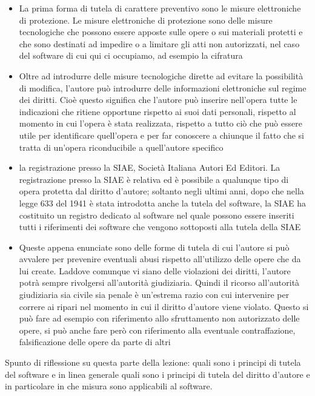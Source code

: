 \begin{itemize}
    \item La prima forma di tutela di carattere preventivo sono le misure elettroniche di protezione. Le misure elettroniche di protezione sono delle misure tecnologiche che possono essere apposte sulle opere o sui materiali protetti e che sono destinati ad impedire o a limitare gli atti non autorizzati, nel caso del software di cui qui ci occupiamo, ad esempio la cifratura
    \item Oltre ad introdurre delle misure tecnologiche dirette ad evitare la possibilità di modifica, l'autore può introdurre delle informazioni elettroniche sul regime dei diritti. Cioè questo significa che l'autore può inserire nell'opera tutte le indicazioni che ritiene opportune rispetto ai suoi dati personali, rispetto al momento in cui l'opera è stata realizzata, rispetto a tutto ciò che può essere utile per identificare quell'opera e per far conoscere a chiunque il fatto che si tratta di un'opera riconducibile a quell'autore specifico
    \item la registrazione presso la SIAE, Società Italiana Autori Ed Editori. La registrazione presso la SIAE è relativa ed è possibile a qualunque tipo di opera protetta dal diritto d'autore; soltanto negli ultimi anni, dopo che nella legge 633 del 1941 è stata introdotta anche la tutela del software, la SIAE ha costituito un registro dedicato al software nel quale possono essere inseriti tutti i riferimenti dei software che vengono sottoposti alla tutela della SIAE
    \item Queste appena enunciate sono delle forme di tutela di cui l'autore si può avvalere per prevenire eventuali abusi rispetto all'utilizzo delle opere che da lui create. Laddove comunque vi siano delle violazioni dei diritti, l'autore potrà sempre rivolgersi all'autorità giudiziaria. Quindi il ricorso all'autorità giudiziaria sia civile sia penale è un'estrema razio con cui intervenire per correre ai ripari nel momento in cui il diritto d'autore viene violato. Questo si può fare ad esempio con riferimento allo sfruttamento non autorizzato delle opere, si può anche fare però con riferimento alla eventuale contraffazione, falsificazione delle opere da parte di altri
\end{itemize}

Spunto di riflessione su questa parte della lezione: quali sono i principi di tutela del software e in linea generale quali sono i principi di tutela del diritto d'autore e in particolare in che misura sono applicabili al software. 

